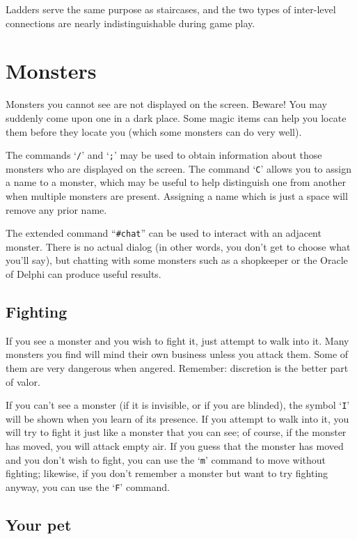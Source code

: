 
Ladders serve the same purpose as staircases, and the two types of
inter-level connections are nearly indistinguishable during game play.

\section{Monsters}


Monsters you cannot see are not displayed on the screen.  Beware!
You may suddenly come upon one in a dark place.  Some magic items can
help you locate them before they locate you (which some monsters can do
very well).

The commands `{\tt /}' and `{\tt ;}' may be used to obtain information about those
monsters who are displayed on the screen.  The command `{\tt C}' allows you
to assign a name to a monster, which may be useful to help distinguish
one from another when multiple monsters are present.  Assigning a name
which is just a space will remove any prior name.

The extended command ``{\tt \#chat}'' can be used to interact with an adjacent
monster.  There is no actual dialog (in other words, you don't get to
choose what you'll say), but chatting with some monsters such as a
shopkeeper or the Oracle of Delphi can produce useful results.
\subsection*{Fighting}


If you see a monster and you wish to fight it, just attempt to walk
into it.  Many monsters you find will mind their own business unless
you attack them.  Some of them are very dangerous when angered.
Remember:  discretion is the better part of valor.

If you can't see a monster (if it is invisible, or if you are blinded),
the symbol `{\tt I}' will be shown when you learn of its presence.
If you attempt to walk into it, you will try to fight it just like
a monster that you can see; of course,
if the monster has moved, you will attack empty air.  If you guess
that the monster has moved and you don't wish to fight, you can use the `{\tt m}'
command to move without fighting; likewise, if you don't remember a monster
but want to try fighting anyway, you can use the `{\tt F}' command.
\subsection*{Your pet}

